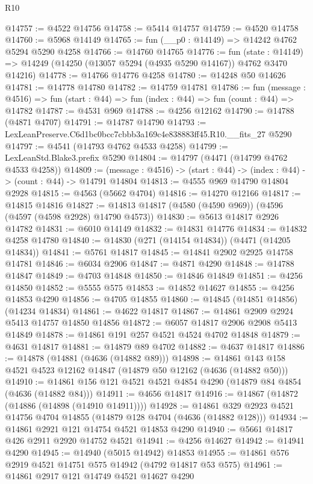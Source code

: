 \begin{lexlean}{R10}
\begin{coremodule}
@14757 := @4522 @14756
@14758 := @5414 @14757
@14759 := @4520 @14758
@14760 := @5968 @14149
@14765 := fun (__p0 : @14149) => @14242 @4762 @5294 @5290 @4258
@14766 := @14760 @14765
@14776 := fun (state : @14149) =>
  @14249 (@14250 (@13057 @5294 (@4935 @5290 @14167)) @4762 @3470 @14216)
@14778 := @14766 @14776 @4258
@14780 := @14248 @50 @14626
@14781 := @14778 @14780
@14782 := @14759 @14781
@14786 := fun (message : @4516) =>
  fun (start : @44) => fun (index : @44) => fun (count : @44) => @14782
@14787 := @4531 @969
@14788 := @4256 @12162
@14790 := @14788 (@4871 @4707)
@14791 := @14787 @14790
@14793 := LexLeanPreserve.C6d1bc0bcc7cbbb3a169c4e838883ff45.R10.__fits_27 @5290
@14797 := @4541 (@14793 @4762 @4533 @4258)
@14799 := LexLeanStd.Blake3.prefix @5290
@14804 := @14797 (@4471 (@14799 @4762 @4533 @4258))
@14809 := (message : @4516) -> (start : @44) -> (index : @44) -> (count : @44) -> @14791 @14804
@14813 := @4555 @969 @14790 @14804 @2928
@14815 := @4563 (@5662 @4704)
@14816 := @14270 @12166
@14817 := @14815 @14816
@14827 := @14813 @14817 (@4580 (@4590 @969)) (@4596 (@4597 (@4598 @2928) @14790 @4573))
@14830 := @5613 @14817 @2926 @14782
@14831 := @6010 @14149
@14832 := @14831 @14776
@14834 := @14832 @4258 @14780
@14840 := @14830 (@271 (@14154 @14834)) (@4471 (@14205 @14834))
@14841 := @5761 @14817
@14845 := @14841 @2902 @2925 @14758 @14781
@14846 := @6034 @2906
@14847 := @4871 @4290
@14848 := @14788 @14847
@14849 := @4703 @14848
@14850 := @14846 @14849
@14851 := @4256 @14850
@14852 := @5555 @575
@14853 := @14852 @14627
@14855 := @4256 @14853 @4290
@14856 := @4705 @14855
@14860 := @14845 (@14851 @14856) (@14234 @14834)
@14861 := @4622 @14817
@14867 := @14861 @2909 @2924 @5413 @14757 @14850 @14856
@14872 := @6057 @14817 @2906 @2908 @5413 @14849
@14878 := @14861 @191 @257 @4521 @4524 @4702 @14848
@14879 := @4631 @14817
@14881 := @14879 @89 @4702
@14882 := @4637 @14817
@14886 := @14878 (@14881 (@4636 (@14882 @89)))
@14898 := @14861 @143 @158 @4521 @4523 @12162 @14847 (@14879 @50 @12162 (@4636 (@14882 @50)))
@14910 := @14861 @156 @121 @4521 @4521 @4854 @4290 (@14879 @84 @4854 (@4636 (@14882 @84)))
@14911 := @4656 @14817
@14916 := @14867 (@14872 (@14886 (@14898 (@14910 @14911))))
@14928 := @14861 @329 @2923 @4521 @14756 @4704 @14855 (@14879 @128 @4704 (@4636 (@14882 @128)))
@14934 := @14861 @2921 @121 @14754 @4521 @14853 @4290
@14940 := @5661 @14817 @426 @2911 @2920 @14752 @4521
@14941 := @4256 @14627
@14942 := @14941 @4290
@14945 := @14940 (@5015 @14942) @14853
@14955 := @14861 @576 @2919 @4521 @14751 @575 @14942 (@4792 @14817 @53 @575)
@14961 := @14861 @2917 @121 @14749 @4521 @14627 @4290

\end{coremodule}
\end{lexlean}
